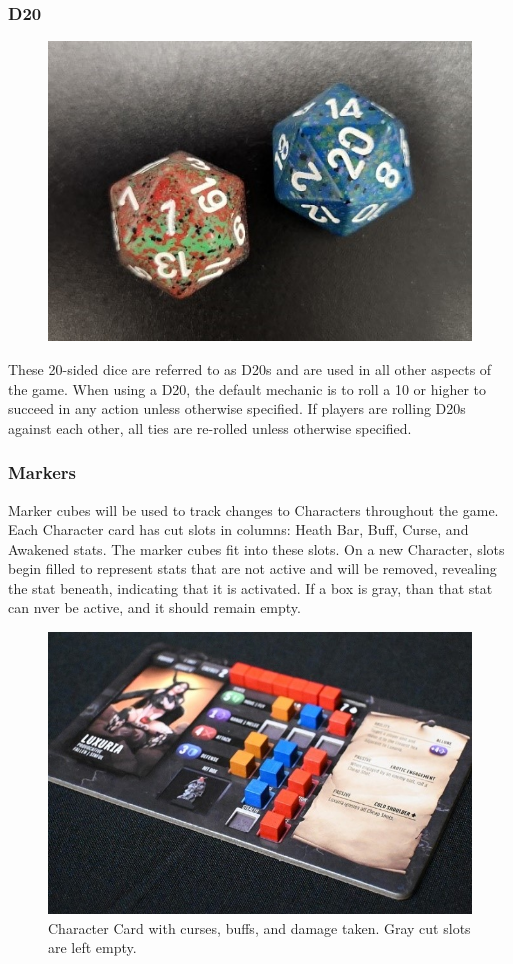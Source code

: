 \documentclass[../main.tex]{subfiles}
\begin{document}
\subsubsection{D20}
\begin{figure}[h]
    \centering
    \includegraphics[width=0.90\linewidth]{chapters//generalInformation/TimeStrikeD20Dice.jpg}
\end{figure}
These 20-sided dice are referred to as D20s and are used in all other aspects of the game. When using a D20, the default mechanic is to roll a 10 or higher to succeed in any action unless otherwise specified. If players are rolling D20s against each other, all ties are re-rolled unless otherwise specified. 

\subsubsection{Markers}
Marker cubes will be used to track changes to Characters throughout the game. Each Character card has cut slots in columns: Heath Bar, Buff, Curse, and Awakened stats. The marker cubes fit into these slots. 
On a new Character, slots begin filled to represent stats that are not active and will be removed, revealing the stat beneath, indicating that it is activated. If a box is gray, than that stat can nver be active, and it should remain empty. 
\begin{figure}[h]
    \centering
    \includegraphics[width=1\linewidth]{chapters//generalInformation/TimeStrikeCharacterCardSlotsMarkers.jpg}
    \caption{Character Card with curses, buffs, and damage taken. Gray cut slots are left empty.}
\end{figure}
\end{document}
